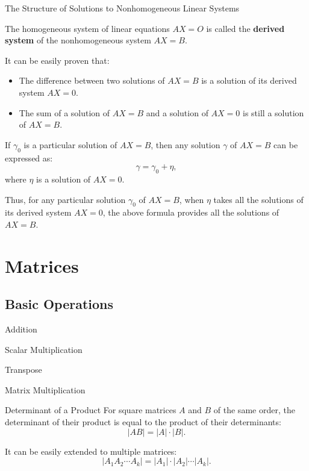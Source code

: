\documentclass[11pt]{../../TexTemplate/elegantbook} %
\begin{document}
\begin{leftbarTitle}{The Structure of Solutions to Nonhomogeneous Linear Systems}\end{leftbarTitle}
The homogeneous system of linear equations \( AX = O \) is called the \textbf{derived system} of 
the nonhomogeneous system \( AX = B \).

It can be easily proven that:
\begin{itemize}
    \item The difference between two solutions of \( AX = B \) is a solution of its derived system \( AX = 0 \).
    \item The sum of a solution of \( AX = B \) and a solution of \( AX = 0 \) is still a solution of \( AX = B \).
\end{itemize}

\vspace{0.7cm}
If \( \gamma_{0} \) is a particular solution of \( AX = B \), 
then any solution \( \gamma \) of \( AX = B \) can be expressed as:
\[
\gamma = \gamma_{0} + \eta,
\]
where \( \eta \) is a solution of \( AX = 0 \).

Thus, for any particular solution \( \gamma_{0} \) of \( AX = B \), 
when \( \eta \) takes all the solutions of its derived system \( AX = 0 \), 
the above formula provides all the solutions of \( AX = B \).

\chapter{Matrices}
\section{Basic Operations}
\begin{leftbarTitle}{Addition}\end{leftbarTitle}
\begin{leftbarTitle}{Scalar Multiplication}\end{leftbarTitle}
\begin{leftbarTitle}{Transpose}\end{leftbarTitle}
\begin{leftbarTitle}{Matrix Multiplication}\end{leftbarTitle}

\begin{theorem}{Determinant of a Product}
    For square matrices \( A \) and \( B \) of the same order, 
    the determinant of their product is equal to the product of their determinants:
    \[
    |AB| = |A| \cdot |B|.
    \]

    It can be easily extended to multiple matrices:
    \[
    |A_1 A_2 \cdots A_k| = |A_1| \cdot |A_2| \cdots |A_k|.
    \]
\end{theorem}
\end{document}
